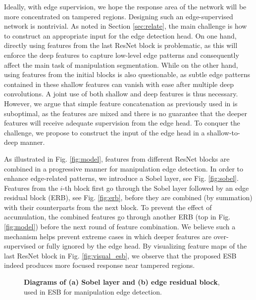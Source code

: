 Ideally, with edge supervision, we hope the response area of the network will be more concentrated on tampered regions. Designing such an edge-supervised network is nontrivial. As noted in Section \ref{sec:relate}, the main challenge is how to construct an appropriate input for the edge detection head. On one hand, directly using features from the last ResNet block is problematic, as this will enforce the deep features to capture low-level edge patterns and consequently affect the main task of manipulation segmentation. While on the other hand, using features from the initial blocks is also questionable, as subtle edge patterns contained in these shallow features can vanish with ease after multiple deep convolutions. A joint use of both shallow and deep features is thus necessary. However, we argue that simple feature concatenation as previously used in \cite{2020GSR} is suboptimal, as the features are mixed and there is no guarantee that the deeper features will receive adequate supervision from the edge head. To conquer the challenge, we propose to construct the input of the edge head in a shallow-to-deep manner.




As illustrated in Fig. \ref{fig:model}, features from different ResNet blocks are combined in a progressive manner for manipulation edge detection. In order to enhance edge-related patterns, we introduce a Sobel layer, see Fig. \ref{fig:sobel}. Features from the $i$-th block first go through the Sobel layer followed by an edge residual block (ERB), see Fig. \ref{fig:erb}, before they are combined (by summation) with their counterparts from the next block. To prevent the effect of accumulation, the combined features go through another ERB (top in Fig. \ref{fig:model}) before the next round of feature combination. We believe such a mechanism helps prevent extreme cases in which deeper features are over-supervised or fully ignored by the edge head. By visualizing feature maps of the last ResNet block in Fig. \ref{fig:visual_esb}, we observe that the proposed ESB indeed produces  more focused response near tampered regions.  



\begin{figure}[htbp]
\begin{center}

\end{center}
\caption{\textbf{Diagrams of (a) Sobel layer and (b) edge residual block}, used in ESB for manipulation edge detection.}
\label{fig:sobel-erb}
\end{figure}

